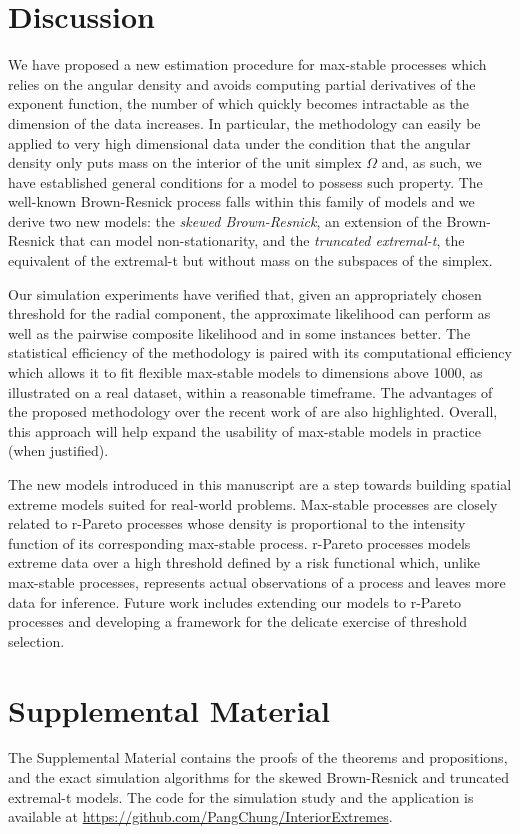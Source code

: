 \documentclass[lineno]{biometrika}
\begin{document}
\section{Discussion}
We have proposed a new estimation procedure for max-stable processes which relies on the angular density and avoids computing partial derivatives of the exponent function, the number of which quickly becomes intractable as the dimension of the data increases. In particular, the methodology can easily be applied to very high dimensional data under the condition that the angular density only puts mass on the interior of the unit simplex $\Omega$ and, as such, we have established general conditions for a model to possess such property. The well-known Brown-Resnick process falls within this family of models and we derive two new models: the \emph{skewed Brown-Resnick}, an extension of the Brown-Resnick that can model non-stationarity, and the \emph{truncated extremal-t}, the equivalent of the extremal-t but without mass on the subspaces of the simplex.  

Our simulation experiments have verified that, given an appropriately chosen threshold for the radial component, the approximate likelihood can perform as well as the pairwise composite likelihood and in some instances better. The statistical efficiency of the methodology is paired with its computational efficiency which allows it to fit flexible max-stable models to dimensions above 1000, as illustrated on a real dataset, within a reasonable timeframe. The advantages of the proposed methodology over the recent work of \citet{Huser.Zhong:2023} are also highlighted. Overall, this approach will help expand the usability of max-stable models in practice (when justified).  

The new models introduced in this manuscript are a step towards building spatial extreme models suited for real-world problems. Max-stable processes are closely related to r-Pareto processes \citep{deFondeville.Davison:2018} whose density is proportional to the intensity function of its corresponding max-stable process. r-Pareto processes models extreme data over a high threshold defined by a risk functional which, unlike max-stable processes, represents actual observations of a process and leaves more data for inference. Future work includes extending our models to r-Pareto processes and developing a framework for the delicate exercise of threshold selection.

\section*{Supplemental Material}
The Supplemental Material contains the proofs of the theorems and propositions, and the exact simulation algorithms for the skewed Brown-Resnick and truncated extremal-t models. The code for the simulation study and the application is available at \url{https://github.com/PangChung/InteriorExtremes}. 



\end{document}
